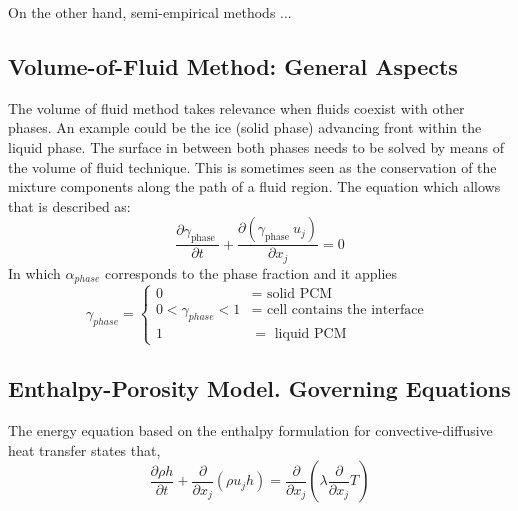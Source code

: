 On the other hand, semi-empirical methods ...
\subsection{Volume-of-Fluid Method: General Aspects}
The volume of fluid method takes relevance when fluids coexist with other phases. An example could be the ice (solid phase) advancing front within the liquid phase. The surface in between both phases needs to be solved by means of the volume of fluid technique.
\newline
This is sometimes seen as the conservation of the mixture components along the path of a fluid region. The equation which allows that is described as:
\begin{equation}
	\frac{\partial \gamma_{\text {phase }}}{\partial t}+\frac{\partial\left(\gamma_{\text {phase }} u_{j}\right)}{\partial x_{j}}=0
\end{equation}
In which $\alpha_{phase}$ corresponds to the phase fraction and it applies
\begin{equation}
	\gamma_{phase}= \begin{cases}
		0 & =\text { solid PCM } \\ 0<\gamma_{phase}<1 & =\text { cell contains the interface } \\ 1 & =\text { liquid } \mathrm{PCM}
	\end{cases}
\end{equation}

\subsection{Enthalpy-Porosity Model. Governing Equations}
The energy equation based on the enthalpy formulation for convective-diffusive heat transfer states that,
\begin{equation}
	\frac{\partial \rho h}{\partial t}+\frac{\partial}{\partial x_{j}}\left(\rho u_{j} h\right)=\frac{\partial}{\partial x_{j}}\left(\lambda \frac{\partial}{\partial x_{j}} T\right)
\end{equation}

